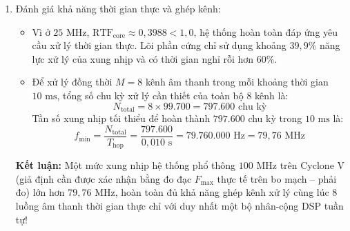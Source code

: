 \begin{enumerate}[label=\alph*)]
    \item Đánh giá khả năng thời gian thực và ghép kênh:
    \begin{itemize}[leftmargin=1.5em, itemsep=2pt]
        \item Vì ở $25\text{ MHz}$, $\text{RTF}_{\text{core}} \approx 0{,}3988 < 1{,}0$, hệ thống hoàn toàn đáp ứng yêu cầu xử lý thời gian thực. Lõi phần cứng chỉ sử dụng khoảng $39{,}9\%$ năng lực xử lý của xung nhịp và có thời gian nghỉ rỗi hơn $60\%$.
        \item Để xử lý đồng thời $M = 8$ kênh âm thanh trong mỗi khoảng thời gian $10\text{ ms}$, tổng số chu kỳ xử lý cần thiết của toàn bộ 8 kênh là:
        \begin{equation}
            N_{\text{total}} = 8 \times 99.700 = 797.600\text{ chu kỳ}
        \end{equation}
        Tần số xung nhịp tối thiểu để hoàn thành $797.600$ chu kỳ trong $10\text{ ms}$ là:
        \begin{equation}
            f_{\min} = \frac{N_{\text{total}}}{T_{\text{hop}}} = \frac{797.600}{0{,}010\text{ s}} = 79.760.000\text{ Hz} = 79{,}76\text{ MHz}
        \end{equation}
    \end{itemize}
    \textbf{Kết luận:} Một mức xung nhịp hệ thống phổ thông $100\text{ MHz}$ trên Cyclone V (giả định cần được xác nhận bằng đo đạc $F_{\max}$ thực tế trên bo mạch -- phải đo) lớn hơn $79{,}76\text{ MHz}$, hoàn toàn đủ khả năng ghép kênh xử lý cùng lúc 8 luồng âm thanh thời gian thực chỉ với duy nhất một bộ nhân-cộng DSP tuần tự!
\end{enumerate}


